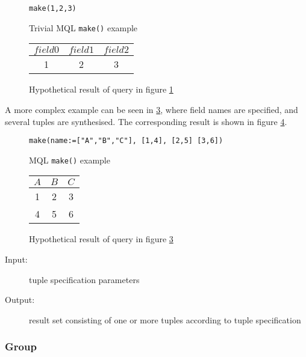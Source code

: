 \begin{figure}[!h]
\centering
\begin{Verbatim}
make(1,2,3)
\end{Verbatim}
\caption{Trivial MQL \texttt{make()} example}
\label{figure:mql:make_example1}
\end{figure}

\begin{figure}[!h]
\centering
\begin{tabular}{|c | c | c |}
\hline
$field0$ & $field1$ & $field2$ \\ \hline
1 & 2 & 3 \\ \hline
\end{tabular}
\caption{Hypothetical result of query in figure
\ref{figure:mql:make_example1}}
\label{figure:mql:make_example1_result}
\end{figure}

A more complex example can be seen in \ref{figure:mql:make_example2}, where
field names are specified, and several tuples are synthesised. The
corresponding result is shown in figure \ref{figure:mql:make_example2_result}.

\begin{figure}[!h]
\centering
\begin{Verbatim}
make(name:=["A","B","C"], [1,4], [2,5] [3,6])
\end{Verbatim}
\caption{MQL \texttt{make()} example}
\label{figure:mql:make_example2}
\end{figure}

\begin{figure}[!h]
\centering
\begin{tabular}{|c | c | c |}
\hline
$A$ & $B$ & $C$ \\ \hline
1 & 2 & 3 \\ \hline
4 & 5 & 6 \\ \hline
\end{tabular}
\caption{Hypothetical result of query in figure
\ref{figure:mql:make_example2}}
\label{figure:mql:make_example2_result}
\end{figure}

\begin{description}
  \item[Input:] tuple specification parameters
  \item[Output:] result set consisting of one or more tuples according to tuple
  specification
\end{description}

\subsubsection{Group}

